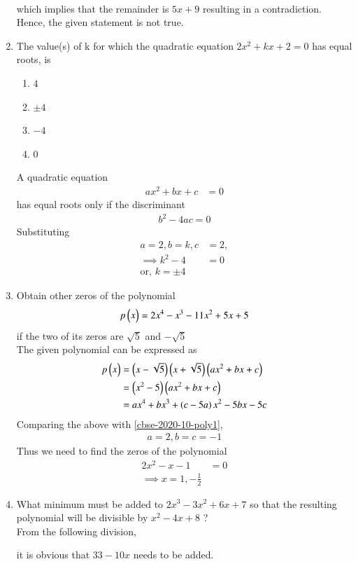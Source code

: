 \documentclass[journal,12pt,twocolumn]{IEEEtran}
\begin{document}
\begin{enumerate}
\\
  which implies that the remainder is $5x+9$ resulting in a contradiction.  Hence, the given statement is not true.
\item The value(s) of k for which the quadratic equation $2x^2 + kx + 2 = 0$ has equal roots, is
\begin{enumerate}
    \item $4$
    \item $\pm 4$
    \item $- 4$\
    \item $0$
\end{enumerate}
\solution 
A quadratic equation 
		\begin{align}
			ax^2+bx + c  &= 0
		\end{align}
		has equal roots only if 
 the discriminant
		\begin{align}
			b^2 - 4a c  = 0
		\end{align}
		Substituting
		\begin{align}
			a = 2, b = k, c &= 2,
			\\
\implies 			k^2 - 4 &= 0
			\\
			\text{or, }k = \pm 4
		\end{align}
        \item  Obtain other zeros of the polynomial
		\begin{align}
			\label{cbse-2020-10-poly1}
p \begin{pmatrix}x\end{pmatrix} = 2x^4 - x^3 - 11x^2 + 5x + 5
		\end{align}
    if the two of its zeros are $\sqrt{5}$ and $- \sqrt{5}$\\
    \solution The given polynomial can be expressed as
		\begin{align}
			p \begin{pmatrix}x\end{pmatrix} 
			&= \left(x - \sqrt{5}\right)\left(x + \sqrt{5}\right)\left(ax^2 + bx + c \right)
			\\
			&= \left(x^2 - 5\right)\left(ax^2 + bx + c \right)
			\\
			&= ax^4 +bx^3 +\left(c-5a\right)x^2 -5bx -5c
		\end{align}
			Comparing the above with \eqref{cbse-2020-10-poly1}, 
		\begin{align}
			a = 2, b = c = -1
		\end{align}
		Thus we need to find the zeros of the polynomial 
		\begin{align}
			2x^2 -x -1 &= 0
			\\
			\implies x = 1, -\frac{1}{2}
		\end{align}
        \item What minimum must be added to $2x^3 - 3x^2 + 6x + 7$ so that the resulting polynomial will be divisible by $x^2 - 4x + 8$ ?\\
		\solution  From the following division,



it is obvious that $33-10x$ needs to be added.
\end{enumerate}
\end{document}

